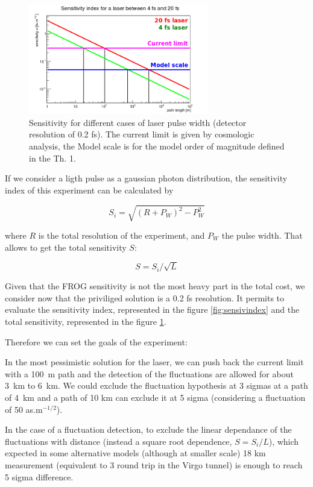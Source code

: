 \documentclass[9pt, a4, twoside]{article}
\begin{document}
\begin{figure}[!]
\centering
\includegraphics[width=0.7\textwidth]{./img/total_sensitivity.png}
\caption{Sensitivity   for different cases of laser pulse width (detector resolution of 0.2  fs). The current limit is given by  cosmologic analysis, the Model scale  is for the model order of magnitude defined in the Th. 1.}
\label{fig:sensiv}
\end{figure}

If we consider a ligth pulse as a gaussian photon distribution, the sensitivity index of this experiment can be calculated by

\[S_i = \sqrt{(R+P_W)^2-P_W^2} \]

where $R$ is the total resolution of the experiment, and $P_W$ the pulse width. That allows to get the total sensitivity $S$:

\[ S=S_i/\sqrt{L} \]

Given that the FROG sensitivity is not the most heavy part in the total cost, we consider now that the priviliged solution is a 0.2 fs resolution. It permits to evaluate the sensitivity index, represented in the figure \ref {fig:sensivindex} and the total sensitivity, represented in the figure \ref {fig:sensiv}.
	
Therefore we can set the goals of the experiment: 
    
In the most pessimistic solution for the laser, we can push back the current limit with a 100~m path and the detection of the fluctuations are allowed for about 3~km to 6~km. We could exclude the fluctuation hypothesis at 3 sigmas at a path of 4~km and a path of 10 km can exclude it at 5 sigma (considering a fluctuation of 50 as.m$^{-1/2}$).


In the case of a fluctuation detection, to exclude the linear dependance of the fluctuations with distance (instead a square root dependence, $S=S_i/L$), which expected in some alternative models (although at smaller scale) 18 km measurement (equivalent to 3 round trip in the Virgo tunnel) is enough to reach 5 sigma difference.
\end{document}
